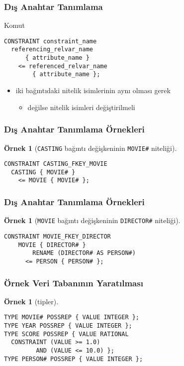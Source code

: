 \documentclass[dvipsnames]{beamer}
\theoremstyle{definition}
\theoremstyle{example}
\newtheorem{ornek}[theorem]{Örnek}
\theoremstyle{plain}
\begin{document}
\begin{frame}[fragile]
  \frametitle{Dış Anahtar Tanımlama}

  \begin{block}{Komut}
    \begin{lstlisting}
CONSTRAINT constraint_name
  referencing_relvar_name
      { attribute_name }
    <= referenced_relvar_name
        { attribute_name };
    \end{lstlisting}
  \end{block}

  \begin{itemize}
    \item iki bağıntıdaki nitelik isimlerinin aynı olması gerek
    \begin{itemize}
      \item değilse nitelik isimleri değiştirilmeli
    \end{itemize}
  \end{itemize}
\end{frame}

\begin{frame}[fragile]
  \frametitle{Dış Anahtar Tanımlama Örnekleri}

  \begin{ornek}[\texttt{CASTING} bağıntı değişkeninin \texttt{MOVIE\#} niteliği]
    \begin{lstlisting}
CONSTRAINT CASTING_FKEY_MOVIE
  CASTING { MOVIE# }
    <= MOVIE { MOVIE# };
    \end{lstlisting}
  \end{ornek}
\end{frame}

\begin{frame}[fragile]
  \frametitle{Dış Anahtar Tanımlama Örnekleri}

  \begin{ornek}[\texttt{MOVIE} bağıntı değişkeninin \texttt{DIRECTOR\#} niteliği]
    \begin{lstlisting}
CONSTRAINT MOVIE_FKEY_DIRECTOR
    MOVIE { DIRECTOR# }
        RENAME (DIRECTOR# AS PERSON#)
      <= PERSON { PERSON# };
    \end{lstlisting}
  \end{ornek}
\end{frame}

\begin{frame}[fragile]
  \frametitle{Örnek Veri Tabanının Yaratılması}

  \begin{ornek}[tipler]
    \begin{lstlisting}
TYPE MOVIE# POSSREP { VALUE INTEGER };
TYPE YEAR POSSREP { VALUE INTEGER };
TYPE SCORE POSSREP { VALUE RATIONAL
  CONSTRAINT (VALUE >= 1.0)
         AND (VALUE <= 10.0) };
TYPE PERSON# POSSREP { VALUE INTEGER };
    \end{lstlisting}
  \end{ornek}
\end{frame}
\end{document}
